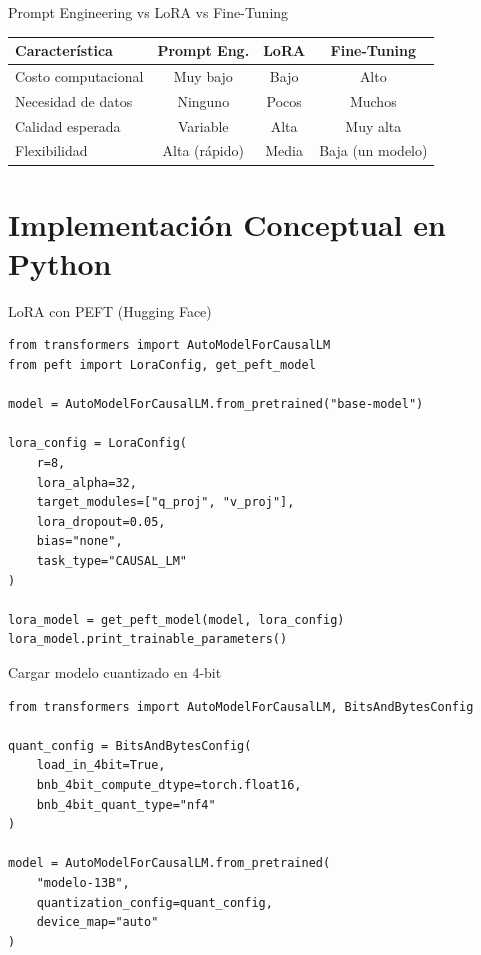 \documentclass[aspectratio=169, 10pt, xcolor=table]{beamer}
\begin{document}
\begin{frame}{Prompt Engineering vs LoRA vs Fine-Tuning}
    \begin{table}
        \centering
        \begin{tabular}{l|c|c|c}
            \toprule
            \textbf{Característica} & \textbf{Prompt Eng.} & \textbf{LoRA} & \textbf{Fine-Tuning} \\
            \midrule
            Costo computacional & Muy bajo & Bajo & Alto \\
            Necesidad de datos & Ninguno & Pocos & Muchos \\
            Calidad esperada & Variable & Alta & Muy alta \\
            Flexibilidad & Alta (rápido) & Media & Baja (un modelo) \\
            \bottomrule
        \end{tabular}
    \end{table}
\end{frame}

\section{Implementación Conceptual en Python}

\begin{frame}[fragile]{LoRA con PEFT (Hugging Face)}
    \begin{lstlisting}
from transformers import AutoModelForCausalLM
from peft import LoraConfig, get_peft_model

model = AutoModelForCausalLM.from_pretrained("base-model")

lora_config = LoraConfig(
    r=8,
    lora_alpha=32,
    target_modules=["q_proj", "v_proj"],
    lora_dropout=0.05,
    bias="none",
    task_type="CAUSAL_LM"
)

lora_model = get_peft_model(model, lora_config)
lora_model.print_trainable_parameters()
    \end{lstlisting}
\end{frame}

\begin{frame}[fragile]{Cargar modelo cuantizado en 4-bit}
    \begin{lstlisting}
from transformers import AutoModelForCausalLM, BitsAndBytesConfig

quant_config = BitsAndBytesConfig(
    load_in_4bit=True,
    bnb_4bit_compute_dtype=torch.float16,
    bnb_4bit_quant_type="nf4"
)

model = AutoModelForCausalLM.from_pretrained(
    "modelo-13B",
    quantization_config=quant_config,
    device_map="auto"
)
    \end{lstlisting}
\end{frame}
\end{document}
